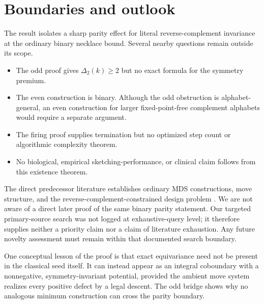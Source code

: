 \section{Boundaries and outlook}
\label{sec:boundaries}

The result isolates a sharp parity effect for literal reverse-complement
invariance at the ordinary binary necklace bound.  Several nearby questions
remain outside its scope.

\begin{itemize}
  \item The odd proof gives $\Delta_2(k)\geq2$ but no exact formula for the
  symmetry premium.
  \item The even construction is binary.  Although the odd obstruction is
  alphabet-general, an even construction for larger fixed-point-free
  complement alphabets would require a separate argument.
  \item The firing proof supplies termination but no optimized step count or
  algorithmic complexity theorem.
  \item No biological, empirical sketching-performance, or clinical claim
  follows from this existence theorem.
\end{itemize}

The direct predecessor literature establishes ordinary MDS constructions,
move structure, and the reverse-complement-constrained design problem
\cite{Mykkeltveit1972,ChamparnaudHanselPerrin2004,MarcaisDeBlasioKingsford2024,MarcaisElderKingsford2024}.
We are not aware of a direct later proof of the same binary parity statement.
Our targeted primary-source search was not logged at exhaustive-query level;
it therefore supplies neither a priority claim nor a claim of literature
exhaustion.  Any future novelty assessment must remain within that documented
search boundary.

One conceptual lesson of the proof is that exact equivariance need not be
present in the classical seed itself.  It can instead appear as an integral
coboundary with a nonnegative, symmetry-invariant potential, provided the
ambient move system realizes every positive defect by a legal descent.  The
odd bridge shows why no analogous minimum construction can cross the parity
boundary.
